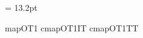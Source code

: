 %
\def\selectfonts#1{\csname #1fonts\endcsname \csname\curfontstyle\endcsname}

\def\rm{\fam=0 \setfontstyle{rm}}
\def\it{\fam=\itfam \setfontstyle{it}}
\def\sl{\fam=\slfam \setfontstyle{sl}}
\def\bf{\fam=\bffam \setfontstyle{bf}}\def\bfstylename{bf}
\def\tt{\fam=\ttfam \setfontstyle{tt}}

\def\rmisbold{\rm\def\curfontstyle{bf}}

\newfam\sffam
\def\sf{\fam=\sffam \setfontstyle{sf}}
\let\li = \sf %

\def\ttsl{\setfontstyle{ttsl}}


\newdimen\textleading  \textleading = 13.2pt

%
\def\lineskipfactor{.08333}
\def\strutheightpercent{.70833}
\def\strutdepthpercent {.29167}
%
\def\baselinefactor{1}
%
\def\setleading#1{%
  \dimen0 = #1\relax
  \normalbaselineskip = \baselinefactor\dimen0
  \normallineskip = \lineskipfactor\normalbaselineskip
  \normalbaselines
  \setbox\strutbox =\hbox{%
    \vrule width0pt height\strutheightpercent\baselineskip
                    depth \strutdepthpercent \baselineskip
  }%
}

%
\expandafter\let\csname cmapOT1\endcsname\gobble
\expandafter\let\csname cmapOT1IT\endcsname\gobble
\expandafter\let\csname cmapOT1TT\endcsname\gobble

